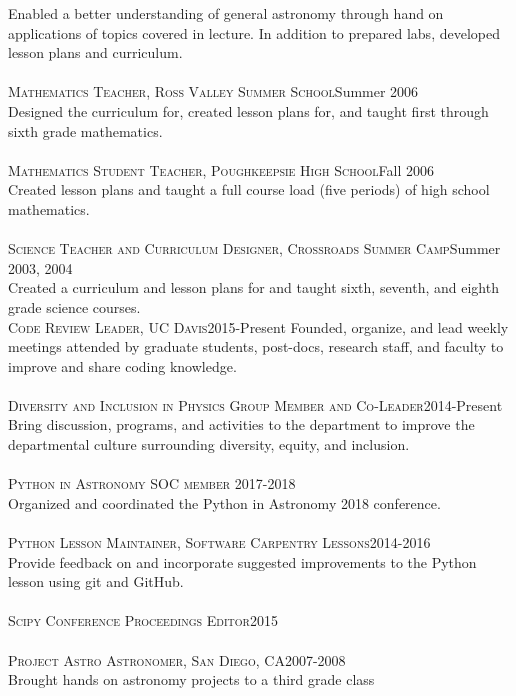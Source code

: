 \documentclass[10pt]{cv}
\begin{document}
\begin{llist}
Enabled a better understanding of general astronomy through hand on applications of topics covered in lecture. In addition to prepared labs, developed lesson plans and curriculum.\\
\\
\textsc{Mathematics Teacher, Ross Valley Summer School}\hfill Summer 2006\\
Designed the curriculum for, created lesson plans for, and taught first through sixth grade mathematics.\\
\\
\textsc{Mathematics Student Teacher, Poughkeepsie High School}\hfill Fall 2006\\
Created lesson plans and taught a full course load (five periods) of high school mathematics.\\
\\
\textsc{Science Teacher and Curriculum Designer, Crossroads Summer Camp}\hfill Summer 2003, 2004 \\
Created a curriculum and lesson plans for and taught sixth, seventh, and eighth grade science courses.\\
\textsc{Code Review Leader, UC Davis}\hfill 2015-Present
Founded, organize, and lead weekly meetings attended by graduate students, post-docs, research staff, and faculty to improve and share coding knowledge.\\
\\
\textsc{Diversity and Inclusion in Physics Group Member and Co-Leader}\hfill 2014-Present\\
Bring discussion, programs, and activities to the department to improve the departmental culture surrounding diversity, equity, and inclusion.\\
\\
\textsc{Python in Astronomy SOC member} \hfill 2017-2018\\
Organized and coordinated the Python in Astronomy 2018 conference.\\
\\
\textsc{Python Lesson Maintainer, Software Carpentry Lessons}\hfill 2014-2016\\
Provide feedback on and incorporate suggested improvements to the Python lesson using git and GitHub.\\
\\
\textsc{Scipy Conference Proceedings Editor}\hfill 2015\\
\\
\textsc{Project Astro Astronomer, San Diego, CA}\hfill 2007-2008\\
Brought hands on astronomy projects to a third grade class\\
\\
\end{llist}
\end{document}
